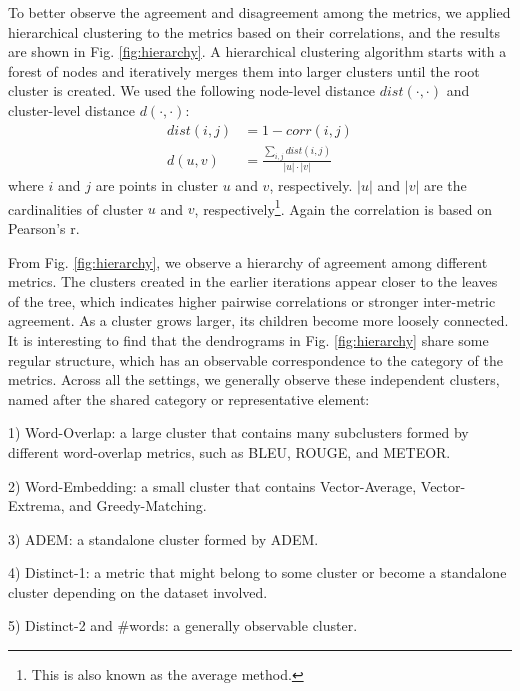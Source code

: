 \documentclass[runningheads]{llncs}
\begin{document}
    To better observe the agreement and disagreement among the metrics, we applied hierarchical clustering to the metrics based on their correlations, and the results are shown in Fig. \ref{fig:hierarchy}. A hierarchical clustering algorithm starts with a forest of nodes and iteratively merges them into larger clusters until the root cluster is created. We used the following node-level distance $\textit{dist}(\cdot, \cdot)$ and cluster-level distance $d(\cdot, \cdot)$:
    \begin{align}
        \textit{dist}(i, j) &= 1 - \textit{corr}(i, j) \\
        d(u, v) &= \frac{\sum_{i,j}\textit{dist}(i, j)}{|u| \cdot |v|}
    \end{align}
    where $i$ and $j$ are points in cluster $u$ and $v$, respectively. $|u|$ and $|v|$ are the cardinalities of cluster $u$ and $v$, respectively\footnote{This is also known as the average method.}. Again the correlation is based on Pearson's r.
    

    From Fig. \ref{fig:hierarchy}, we observe a hierarchy of agreement among different metrics. The clusters created in the earlier iterations appear closer to the leaves of the tree, which indicates higher pairwise correlations or stronger inter-metric agreement. As a cluster grows larger, its children become more loosely connected. It is interesting to find that the dendrograms in Fig. \ref{fig:hierarchy} share some regular structure, which has an observable correspondence to the category of the metrics. Across all the settings, we generally observe these independent clusters, named after the shared category or representative element:

    1) Word-Overlap: a large cluster that contains many subclusters formed by different word-overlap metrics, such as BLEU, ROUGE, and METEOR.

    2) Word-Embedding: a small cluster that contains Vector-Average, Vector-Extrema, and Greedy-Matching.

    3) ADEM: a standalone cluster formed by ADEM.

    4) Distinct-1: a metric that might belong to some cluster or become a standalone cluster depending on the dataset involved.

    5) Distinct-2 and \#words: a generally observable cluster.
\end{document}
